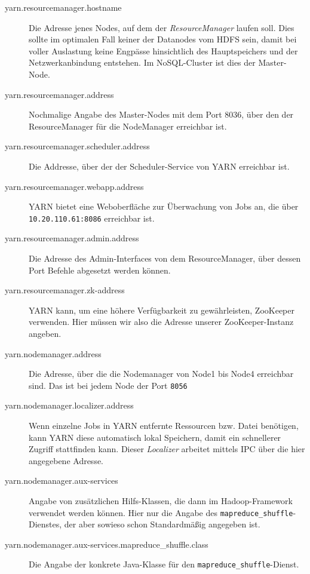 \begin{description}
	\item[yarn.resourcemanager.hostname] Die Adresse jenes Nodes, auf dem der \textit{ResourceManager} laufen soll.
	Dies sollte im optimalen Fall keiner der Datanodes vom HDFS sein, damit bei voller Auslastung keine Engpässe hinsichtlich
	des Hauptspeichers und der Netzwerkanbindung entstehen. Im NoSQL-Cluster ist dies der Master-Node.
	\item[yarn.resourcemanager.address] Nochmalige Angabe des Master-Nodes mit dem Port 8036, über den der
	ResourceManager für die NodeManager erreichbar ist.
	\item[yarn.resourcemanager.scheduler.address] Die Addresse, über der der Scheduler-Service von YARN erreichbar ist.
	\item[yarn.resourcemanager.webapp.address] YARN bietet eine Weboberfläche zur Überwachung von Jobs an, die über \texttt{10.20.110.61:8086} 
	erreichbar ist.
	\item[yarn.resourcemanager.admin.address] Die Adresse des Admin-Interfaces von dem ResourceManager, über dessen Port Befehle abgesetzt werden können.
	\item[yarn.resourcemanager.zk-address] YARN kann, um eine höhere Verfügbarkeit zu gewährleisten, ZooKeeper verwenden. Hier müssen wir also die Adresse unserer
	ZooKeeper-Instanz angeben.
	\item[yarn.nodemanager.address] Die Adresse, über die die Nodemanager von Node1 bis Node4 erreichbar sind. Das ist bei jedem Node der Port \texttt{8056}
	\item[yarn.nodemanager.localizer.address] Wenn einzelne Jobs in YARN entfernte Ressourcen bzw. Datei benötigen, kann YARN diese automatisch lokal Speichern,
	damit ein schnellerer Zugriff stattfinden kann. Dieser \textit{Localizer} arbeitet mittels IPC über die hier angegebene Adresse.
	\item[yarn.nodemanager.aux-services] Angabe von zusätzlichen Hilfs-Klassen, die dann im Hadoop-Framework verwendet werden können. Hier nur die Angabe des \texttt{mapreduce\_shuffle}-Dienstes, der aber sowieso schon Standardmäßig angegeben ist.
	\item[yarn.nodemanager.aux-services.mapreduce\_shuffle.class] Die Angabe der konkrete Java-Klasse für den \texttt{mapreduce\_shuffle}-Dienst.
\end{description}
